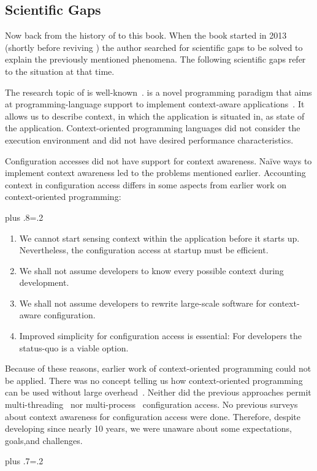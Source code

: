 \subsection{Scientific Gaps}

Now back from the history of \elektra{} to this book.
When the book started in 2013 (shortly before reviving \elektra{}) the author searched for scientific gaps to be solved to explain the previously mentioned phenomena.
The following scientific gaps refer to the situation at that time.

The research topic of  is well-known~\cite{riva2006unearthing,baldauf2007survey}.
 is a novel programming paradigm that aims at programming-language support to implement context-aware applications~\cite{keays2003context,kamina2014context,appeltauer2009contextcomparision,hirschfeld2008context}.
It allows us to describe context, in which the application is situated in, as state of the application.
Context-oriented programming languages did not consider the execution environment and did not have desired performance characteristics.

Configuration accesses did not have support for context awareness.
Na\"{i}ve ways to implement context awareness led to the problems mentioned earlier.
Accounting context in configuration access differs in some aspects from earlier work on context-\linebreak{}oriented programming:
{\parfillskip=0pt plus .8\textwidth \emergencystretch=.2\textwidth \par}


\begin{enumerate}
\item We cannot start sensing context within the application before it starts up.
Nevertheless, the configuration access at startup must be efficient.
\item We shall not assume developers to know every possible context during development.
\item We shall not assume developers to rewrite large-scale software for context-aware configuration.
\item Improved simplicity for configuration access is essential:
For developers the status-quo is a viable option.
\end{enumerate}


Because of these reasons, earlier work of context-oriented programming could not be applied.
There was no concept telling us how context-oriented programming can be used without large overhead~\cite{raab2014program}.
Neither did the previous approaches permit multi-threading~\cite{raab2015global} nor multi-process~\cite{raab2016persistent} configuration access.
No previous surveys about context awareness for configuration access were done.
Therefore, despite developing \elektra{} since nearly 10 years, we were unaware about some expectations, goals,\linebreak and challenges.%
{\parfillskip=0pt plus .7\textwidth \emergencystretch=.2\textwidth \par}

